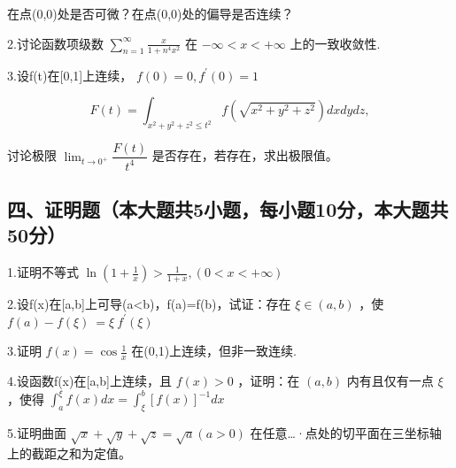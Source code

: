 \documentclass[11pt,fontset=fandol]{ctexart}
\begin{document}
在点(0,0)处是否可微？在点(0,0)处的偏导是否连续？

2.讨论函数项级数
\(\sum \limits _ { n = 1 } ^ { \infty } \frac { x } { 1 + n ^ { 4 } x ^ { 2 } }\)
在 \(- \infty < x < + \infty\) 上的一致收敛性.

3.设f(t)在{[}0,1{]}上连续， \(f ( 0 ) = 0 , f ^ { \prime } ( 0 ) = 1\)

\[
F ( t ) = \int _ { x ^ { 2 } + y ^ { 2 } + z ^ { 2 } \leq t ^ { 2 } } f ( { \sqrt { x ^ { 2 } + y ^ { 2 } + z ^ { 2 } } } ) d x d y d z ,
\]

讨论极限 \(\lim_{t\to0^+}\dfrac{F(t)}{t^4}\)
是否存在，若存在，求出极限值。

\subsection{四、证明题（本大题共5小题，每小题10分，本大题共50分）}\label{ux56dbux8bc1ux660eux9898ux672cux5927ux9898ux51715ux5c0fux9898ux6bcfux5c0fux989810ux5206ux672cux5927ux9898ux517150ux5206}

1.证明不等式
\(\ln \left( 1 + { \frac { 1 } { x } } \right) > { \frac { 1 } { 1 + x } } , ( 0 < x < + \infty )\)

2.设f(x)在{[}a,b{]}上可导(a\textless b)，f(a)=f(b)，试证：存在
\(\xi \in ( a , b )\)
，使\(f ( a ) - f ( \xi ) \ = \xi \ f ^ { \prime } ( \xi )\)

3.证明 \(f ( x ) = \cos { \frac { 1 } { x } }\)
在(0,1)上连续，但非一致连续.

4.设函数f(x)在{[}a,b{]}上连续，且 \(f ( x ) > 0\) ，证明：在
\(( a , b )\) 内有且仅有一点 \(\xi\) ，使得
\(\int _ { a } ^ { \xi } f ( x ) d x = \int _ { \xi } ^ { b } [ f ( x ) ] ^ { - 1 } d x\)

5.证明曲面
\({ \sqrt { x } } + { \sqrt { y } } + { \sqrt { z } } = { \sqrt { a } } \left( a > 0 \right)\)
在任意\ldots·点处的切平面在三坐标轴上的截距之和为定值。
\end{document}
